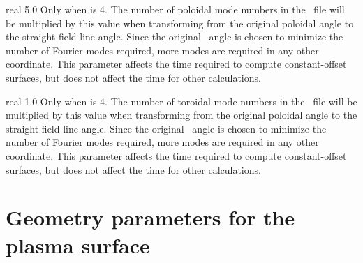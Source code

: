 \myhrule

{real}
{5.0}
{Only when  is 4.}
{The number of poloidal mode numbers in the \vmec~file will be multiplied by this value
when transforming from the original poloidal angle to the straight-field-line angle.
Since the original \vmec~angle is chosen to minimize the number of Fourier modes required,
more modes are required in any other coordinate.
This parameter affects the time required to compute constant-offset surfaces,
but does not affect the time for other calculations.
}

\myhrule

{real}
{1.0}
{Only when  is 4.}
{The number of toroidal mode numbers in the \vmec~file will be multiplied by this value
when transforming from the original poloidal angle to the straight-field-line angle.
Since the original \vmec~angle is chosen to minimize the number of Fourier modes required,
more modes are required in any other coordinate.
This parameter affects the time required to compute constant-offset surfaces,
but does not affect the time for other calculations.
}

\section{Geometry parameters for the plasma surface}

